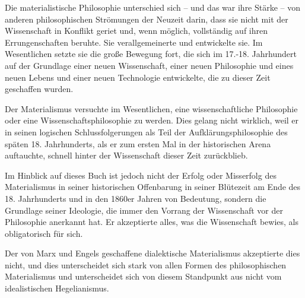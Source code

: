 \documentclass[11pt,a4paper]{book}
\begin{document}
Die materialistische Philosophie unterschied sich -- und das war ihre Stärke -- von anderen philosophischen Strömungen der Neuzeit darin, dass sie nicht mit der Wissenschaft in Konflikt geriet und, wenn möglich, vollständig auf ihren Errungenschaften beruhte. Sie verallgemeinerte und entwickelte sie. Im Wesentlichen setzte sie die große Bewegung fort, die sich im 17.-18. Jahrhundert auf der Grundlage einer neuen Wissenschaft, einer neuen Philosophie und eines neuen Lebens und einer neuen Technologie entwickelte, die zu dieser Zeit geschaffen wurden.



Der Materialismus versuchte im Wesentlichen, eine wissenschaftliche Philosophie oder eine Wissenschaftsphilosophie zu werden. Dies gelang nicht wirklich, weil er in seinen logischen Schlussfolgerungen als Teil der Aufklärungsphilosophie des späten 18. Jahrhunderts, als er zum ersten Mal in der historischen Arena auftauchte, schnell hinter der Wissenschaft dieser Zeit zurückblieb.



Im Hinblick auf dieses Buch ist jedoch nicht der Erfolg oder Misserfolg des Materialismus in seiner historischen Offenbarung in seiner Blütezeit am Ende des 18. Jahrhunderts und in den 1860er Jahren von Bedeutung, sondern die Grundlage seiner Ideologie, die immer den Vorrang der Wissenschaft vor der Philosophie anerkannt hat. Er akzeptierte alles, was die Wissenschaft bewies, als obligatorisch für sich.



Der von Marx und Engels geschaffene dialektische Materialismus akzeptierte dies nicht, und dies unterscheidet sich stark von allen Formen des philosophischen Materialismus und unterscheidet sich von diesem Standpunkt aus nicht vom idealistischen Hegelianismus.
\end{document}
